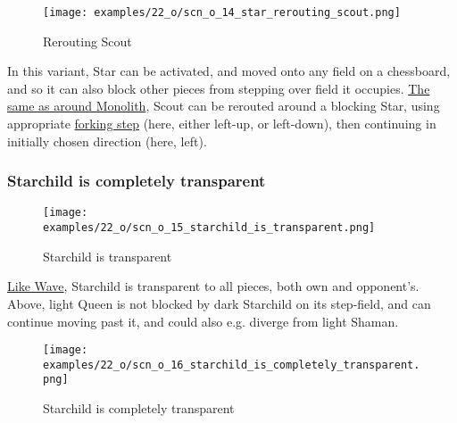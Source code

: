 \noindent
\begin{wrapfigure}[8]{l}{0.4\textwidth}
\centering
\texttt{[image: examples/22\_o/scn\_o\_14\_star\_rerouting\_scout.png]}
\caption{Rerouting Scout}
\label{fig:scn_o_14_star_rerouting_scout}
\end{wrapfigure}
In this variant, Star can be activated, and moved onto any field on a chessboard,
and so it can also block other pieces from stepping over field it occupies.\newline
\indent
\hyperref[fig:scn_d_10_monolith_rerouting_scout]{The same as around Monolith},
Scout can be rerouted around a blocking Star, using appropriate
\hyperref[fig:scn_hd_17_scout_forking_steps]{forking step} (here, either left-up,
or left-down), then continuing in initially chosen direction (here, left).

\clearpage %

\subsubsection*{Starchild is completely transparent}
\label{sec:One/Starchild/Divergence/Starchild is completely transparent}

\vspace*{-1.4\baselineskip}
\noindent
\begin{figure}[!h]
\texttt{[image: examples/22\_o/scn\_o\_15\_starchild\_is\_transparent.png]}
\vspace*{-1.3\baselineskip}
\caption{Starchild is transparent}
\label{fig:scn_o_15_starchild_is_transparent}
\end{figure}

\vspace*{-0.4\baselineskip}
\hyperref[fig:scn_mv_07_wave_is_transparent]{Like Wave}, Starchild is transparent
to all pieces, both own and opponent's. Above, light Queen is not blocked by dark
Starchild on its step-field, and can continue moving past it, and could also e.g.
diverge from light Shaman.

\vspace*{-0.7\baselineskip}
\noindent
\begin{figure}[!h]
\texttt{[image: examples/22\_o/scn\_o\_16\_starchild\_is\_completely\_transparent.png]}
\vspace*{-1.3\baselineskip}
\caption{Starchild is completely transparent}
\label{fig:scn_o_16_starchild_is_completely_transparent}
\end{figure}

